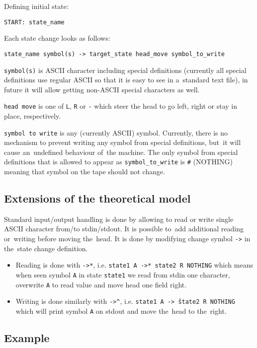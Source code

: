 \documentclass[english,shortabstract,mgr]{iithesis}
\begin{document}
Defining initial state:
\begin{verbatim}
START: state_name
\end{verbatim}

Each state change looks as follows:
\begin{verbatim}
state_name symbol(s) -> target_state head_move symbol_to_write
\end{verbatim}

\texttt{symbol(s)} is ASCII character including special definitions (currently
all special definitions use regular ASCII so that it is easy to see
in a~standard text file), in future it will allow getting non-ASCII special
characters as well.

\texttt{head move} is one of \texttt{L}, \texttt{R} or \texttt{-} which
steer the head to go left, right or stay in place, respectively.

\texttt{symbol to write} is any (currently ASCII) symbol. Currently, there
is no mechanism to prevent writing any symbol from special definitions,
but~it will cause an~undefined behaviour of~the machine. The only symbol
from special definitions that is allowed to appear as \texttt{symbol\_to\_write}
is \texttt{\#} (NOTHING) meaning that symbol on the tape should not change.

\subsection {Extensions of the theoretical model}

Standard input/output handling is done by allowing to read or write single
ASCII character from/to stdin/stdout. It is possible to~add additional
reading or~writing before moving the~head. It is done by modifying change
symbol \texttt{->} in the~state change definition.
\begin{itemize}
  \item Reading is done with \texttt{->*}, i.e. \texttt{state1 A ->* state2 R NOTHING}
        which means when seen symbol \texttt{A} in state \texttt{state1} we read
        from stdin one character, overwrite \texttt{A} to read value and move
        head one field right.
  \item Writing is done similarly with \texttt{->\^},
        i.e. \texttt{state1 A ->\^\ state2 R NOTHING} which will print symbol
        \texttt{A} on stdout and move the~head to the~right.
\end{itemize}

\subsection{Example}
\end{document}
